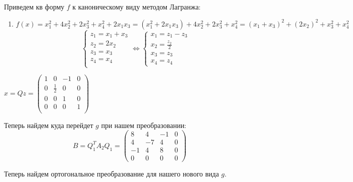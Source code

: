 \documentclass{article}
\begin{document}
Приведем кв форму $f$ к каноническому виду методом Лагранжа:

\begin{enumerate}
    \item $$f(x) = x_1^2 + 4x_2^2 + 2x_3^2 + x_4^2 + 2x_1x_3 = (x_1^2  +2x_1x_3) + 4x_2^2 + 2x_3^2 + x_4^2 = (x_1+x_3)^2 + (2x_2)^2 + x_3^2 +x_4^2$$
    $$\begin{cases}
     z_1 = x_1 +x_3\\
     z_2 = 2x_2\\
     z_3 = x_3\\
     z_4 = x_4\\
    \end{cases} \Leftrightarrow \begin{cases}
        x_1 = z_1 -z_3\\
        x_2 = \frac{z_2}{2}\\
        x_3 = z_3\\
        x_4 = z_4
    \end{cases}$$
\end{enumerate}

$x= Qz = \begin{pmatrix}
    1 & 0& -1 & 0\\
    0 & \frac{1}{2} & 0& 0\\
    0 & 0 & 1& 0\\
    0 & 0 & 0& 1\\
\end{pmatrix}$

Теперь найдем куда перейдет $g$ при нашем преобразовании:
$$B = Q_1^TA_2 Q_1 = \begin{pmatrix}
 8	& 4	&-1	&0\\
 4	&-7	& 4	&0\\
-1	& 4	 &8	&0\\
 0&	 0	& 0&	0
\end{pmatrix}$$

Теперь найдем ортогональное преобразование для нашего нового вида $g$.
\end{document}
